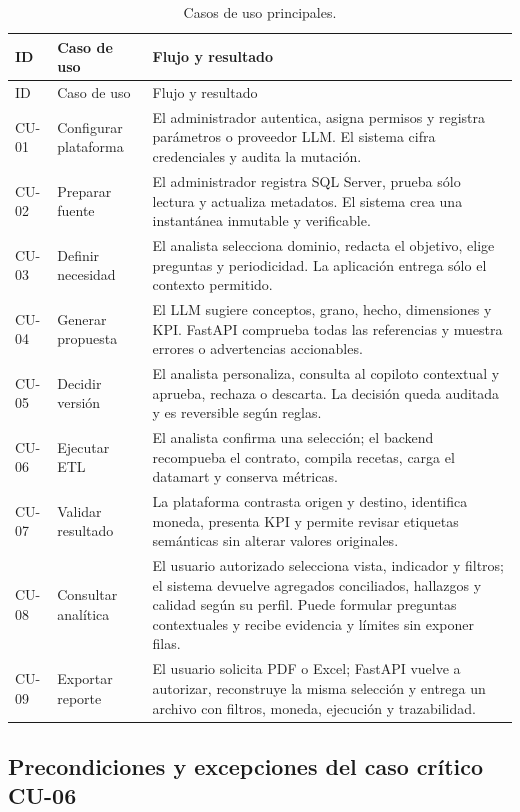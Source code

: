 \documentclass[11pt,letterpaper]{article}
\begin{document}
\begin{longtable}{@{}p{}p{}p{}@{}}
  \caption{Casos de uso principales.}\\
  \toprule
  ID & Caso de uso & Flujo y resultado \\
  \midrule
  \endfirsthead
  \toprule
  ID & Caso de uso & Flujo y resultado \\
  \midrule
  \endhead
  CU-01 & Configurar plataforma & El administrador autentica, asigna permisos y registra parámetros o proveedor LLM. El sistema cifra credenciales y audita la mutación. \\
  CU-02 & Preparar fuente & El administrador registra SQL Server, prueba sólo lectura y actualiza metadatos. El sistema crea una instantánea inmutable y verificable. \\
  CU-03 & Definir necesidad & El analista selecciona dominio, redacta el objetivo, elige preguntas y periodicidad. La aplicación entrega sólo el contexto permitido. \\
  CU-04 & Generar propuesta & El LLM sugiere conceptos, grano, hecho, dimensiones y KPI. FastAPI comprueba todas las referencias y muestra errores o advertencias accionables. \\
  CU-05 & Decidir versión & El analista personaliza, consulta al copiloto contextual y aprueba, rechaza o descarta. La decisión queda auditada y es reversible según reglas. \\
  CU-06 & Ejecutar ETL & El analista confirma una selección; el backend recompueba el contrato, compila recetas, carga el datamart y conserva métricas. \\
  CU-07 & Validar resultado & La plataforma contrasta origen y destino, identifica moneda, presenta KPI y permite revisar etiquetas semánticas sin alterar valores originales. \\
  CU-08 & Consultar analítica & El usuario autorizado selecciona vista, indicador y filtros; el sistema devuelve agregados conciliados, hallazgos y calidad según su perfil. Puede formular preguntas contextuales y recibe evidencia y límites sin exponer filas. \\
  CU-09 & Exportar reporte & El usuario solicita PDF o Excel; FastAPI vuelve a autorizar, reconstruye la misma selección y entrega un archivo con filtros, moneda, ejecución y trazabilidad. \\
  \bottomrule
\end{longtable}

\subsection{Precondiciones y excepciones del caso crítico CU-06}
\end{document}
